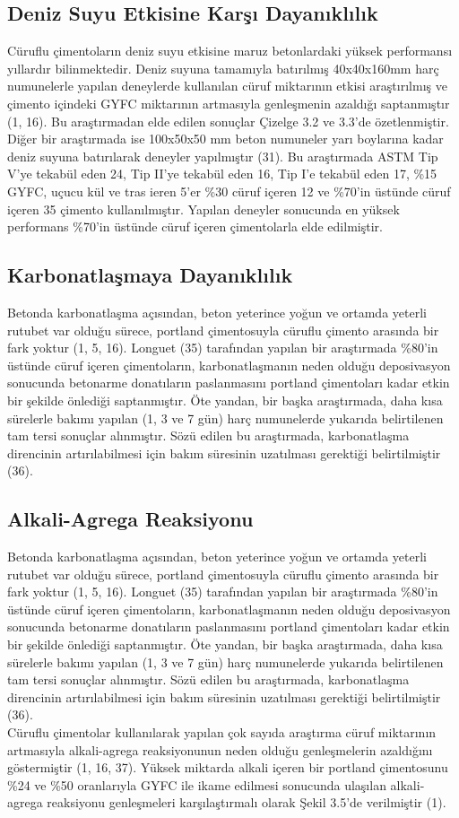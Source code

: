\documentclass[12pt]{article}
\begin{document}
\subsection{Deniz Suyu Etkisine Karşı Dayanıklılık}
Cüruflu çimentoların deniz suyu etkisine maruz betonlardaki yüksek
performansı yıllardır bilinmektedir. Deniz suyuna tamamıyla batırılmış
40x40x160mm harç numunelerle yapılan deneylerde kullanılan cüruf
miktarının etkisi araştırılmış ve çimento içindeki GYFC miktarının artmasıyla
genleşmenin azaldığı saptanmıştır (1, 16). Bu araştırmadan elde edilen
sonuçlar Çizelge 3.2 ve 3.3’de özetlenmiştir.\\[9pt]
Diğer bir araştırmada ise 100x50x50 mm beton numuneler yarı boylarına
kadar deniz suyuna batırılarak deneyler yapılmıştır (31). Bu araştırmada
ASTM Tip V’ye tekabül eden 24, Tip II’ye tekabül eden 16, Tip I’e tekabül
eden 17, \%15 GYFC, uçucu kül ve tras ieren 5’er \%30 cüruf içeren 12
ve \%70’in üstünde cüruf içeren 35 çimento kullanılmıştır. Yapılan deneyler
sonucunda en yüksek performans \%70’in üstünde cüruf içeren çimentolarla
elde edilmiştir.
\subsection{Karbonatlaşmaya Dayanıklılık}
Betonda karbonatlaşma açısından, beton yeterince yoğun ve ortamda yeterli
rutubet var olduğu sürece, portland çimentosuyla cüruflu çimento arasında
bir fark yoktur (1, 5, 16). Longuet (35) tarafından yapılan bir araştırmada
\%80’in üstünde cüruf içeren çimentoların, karbonatlaşmanın neden olduğu
deposivasyon sonucunda betonarme donatıların paslanmasını portland
çimentoları kadar etkin bir şekilde önlediği saptanmıştır. Öte yandan, bir
başka araştırmada, daha kısa sürelerle bakımı yapılan (1, 3 ve 7 gün) harç numunelerde yukarıda belirtilenen tam tersi sonuçlar alınmıştır. Sözü edilen bu araştırmada, karbonatlaşma direncinin artırılabilmesi için bakım süresinin uzatılması gerektiği belirtilmiştir (36).
\subsection{Alkali-Agrega Reaksiyonu}
Betonda karbonatlaşma açısından, beton yeterince yoğun ve ortamda yeterli
rutubet var olduğu sürece, portland çimentosuyla cüruflu çimento arasında
bir fark yoktur (1, 5, 16). Longuet (35) tarafından yapılan bir araştırmada
\%80’in üstünde cüruf içeren çimentoların, karbonatlaşmanın neden olduğu
deposivasyon sonucunda betonarme donatıların paslanmasını portland
çimentoları kadar etkin bir şekilde önlediği saptanmıştır. Öte yandan, bir
başka araştırmada, daha kısa sürelerle bakımı yapılan (1, 3 ve 7 gün) harç
numunelerde yukarıda belirtilenen tam tersi sonuçlar alınmıştır. Sözü edilen
bu araştırmada, karbonatlaşma direncinin artırılabilmesi için bakım süresinin
uzatılması gerektiği belirtilmiştir (36).\\[9pt]
Cüruflu çimentolar kullanılarak yapılan çok sayıda araştırma cüruf miktarının
artmasıyla alkali-agrega reaksiyonunun neden olduğu genleşmelerin
azaldığını göstermiştir (1, 16, 37). Yüksek miktarda alkali içeren bir portland
çimentosunu \%24 ve \%50 oranlarıyla GYFC ile ikame edilmesi sonucunda
ulaşılan alkali-agrega reaksiyonu genleşmeleri karşılaştırmalı olarak Şekil
3.5’de verilmiştir (1).
\end{document}
